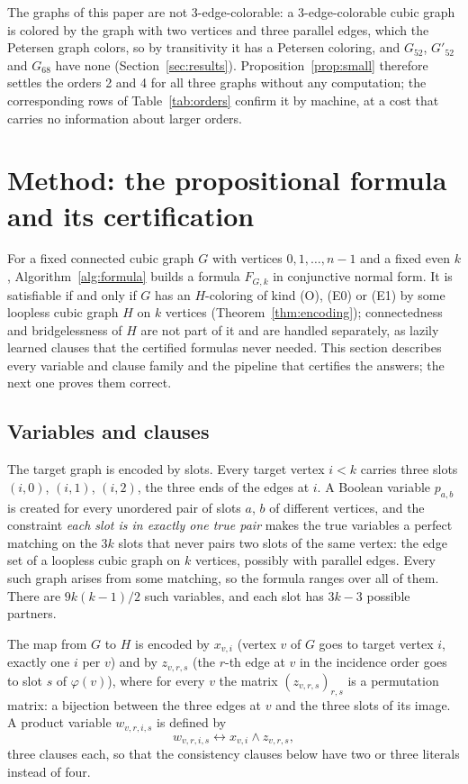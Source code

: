 \documentclass[11pt]{article}
\theoremstyle{definition}
\theoremstyle{remark}
\newcommand{\Ga}{G_{52}}
\newcommand{\Gb}{G'_{52}}
\newcommand{\Gsix}{G_{68}}
\begin{document}
The graphs of this paper are not 3-edge-colorable: a 3-edge-colorable cubic graph is colored by the graph with two vertices and three parallel
edges, which the Petersen graph colors, so by transitivity it has a Petersen coloring, and $\Ga$, $\Gb$ and $\Gsix$ have none (Section~\ref{sec:results}).
Proposition~\ref{prop:small} therefore settles the orders 2 and 4 for all three graphs without any computation; the corresponding rows of
Table~\ref{tab:orders} confirm it by machine, at a cost that carries no information about larger orders.

\section{Method: the propositional formula and its certification}\label{sec:method}

For a fixed connected cubic graph $G$ with vertices $0, 1, \dots, n-1$ and a fixed even $k$, Algorithm~\ref{alg:formula} builds a formula $F_{G,k}$ in
conjunctive normal form. It is satisfiable if and only if $G$ has an $H$-coloring of kind (O), (E0) or (E1) by some loopless cubic graph $H$ on $k$
vertices (Theorem~\ref{thm:encoding}); connectedness and bridgelessness of $H$ are not part of it and are handled separately, as lazily learned clauses
that the certified formulas never needed. This section describes every variable and clause family and the pipeline that certifies the answers; the next
one proves them correct.

\subsection{Variables and clauses}\label{sec:formula}

The target graph is encoded by slots. Every target vertex $i < k$ carries three slots $(i,0)$, $(i,1)$, $(i,2)$, the three ends of the edges at $i$. A Boolean
variable $p_{a,b}$ is created for every unordered pair of slots $a$, $b$ of different vertices, and the constraint \emph{each slot is in exactly one true pair}
makes the true variables a perfect matching on the $3k$ slots that never pairs two slots of the same vertex: the edge set of a loopless cubic graph on $k$ vertices,
possibly with parallel edges. Every such graph arises from some matching, so the formula ranges over all of them. There are $9k(k-1)/2$ such variables, and
each slot has $3k-3$ possible partners.

The map from $G$ to $H$ is encoded by $x_{v,i}$ (vertex $v$ of $G$ goes to target vertex $i$, exactly one $i$ per $v$) and by $z_{v,r,s}$ (the $r$-th edge at
$v$ in the incidence order goes to slot $s$ of $\varphi(v)$), where for every $v$ the matrix $(z_{v,r,s})_{r,s}$ is a permutation matrix: a bijection between the three edges at $v$ and
the three slots of its image. A product variable $w_{v,r,i,s}$ is defined by
\begin{equation}\label{eq:w}
w_{v,r,i,s} \leftrightarrow x_{v,i} \wedge z_{v,r,s},
\end{equation}
three clauses each, so that the consistency clauses below have two or three literals instead of four.
\end{document}
